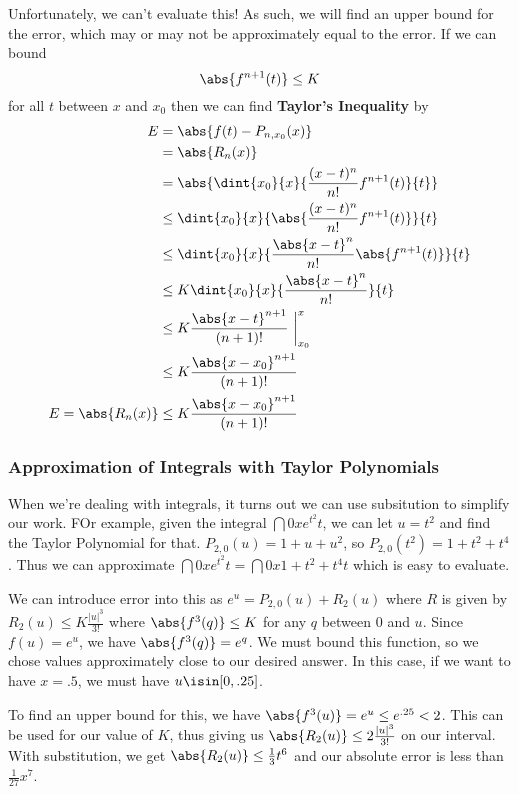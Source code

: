 \documentclass[12pt]{article}
\begin{document}
Unfortunately, we can't evaluate this! As such, we will find an upper bound for the error, which may or may not be approximately equal to the error. If we can bound \[ \abs{f^{n+1}(t)} \leq K \] for all $t$ between $x$ and $x_0$ then we can find {\bf Taylor's Inequality} by
\begin{align*}
E &= \abs{f(t) - P_{n,x_0}(x)}\\
  &= \abs{R_n(x)}\\
  &= \abs{\dint{x_0}{x}{\frac{(x-t)^n}{n!}f^{n+1}(t)}{t}}\\
  &\leq \dint{x_0}{x}{\abs{\frac{(x-t)^n}{n!}f^{n+1}(t)}}{t}\\
  &\leq \dint{x_0}{x}{\frac{\abs{x-t}^n}{n!}\abs{f^{n+1}(t)}}{t}\\
  &\leq K\dint{x_0}{x}{\frac{\abs{x-t}^n}{n!}}{t}\\
  &\leq K\frac{\abs{x-t}^{n+1}}{(n+1)!}\ \bigg|_{x_0}^x\\
  &\leq K\frac{\abs{x-x_0}^{n+1}}{(n+1)!}\\
E = \abs{R_n(x)} &\leq K\frac{\abs{x-x_0}^{n+1}}{(n+1)!}
\end{align*}

\subsubsection*{Approximation of Integrals with Taylor Polynomials}
When we're dealing with integrals, it turns out we can use subsitution to simplify our work. FOr example, given the integral $\dint{0}{x}{e^{t^2}}{t}$, we can let $u = t^2$ and find the Taylor Polynomial for that. $P_{2,0} (u) = 1 + u + u^2$, so $P_{2,0}(t^2) = 1 + t^2 + t^4$. Thus we can approximate $\dint{0}{x}{e^{t^2}}{t} = \dint{0}{x}{1 + t^2 + t^4}{t}$ which is easy to evaluate.

We can introduce error into this as $e^u = P_{2,0}(u) + R_2(u)$ where $R$ is given by $R_2(u) \leq K \frac{|u|^3}{3!}$ where $\abs{f^3(q)} \leq K$ for any $q$ between 0 and $u$.  Since $f(u) = e^u$, we have $\abs{f^3(q)} = e^q$. We must bound this function, so we chose values approximately close to our desired answer. In this case, if we want to have $x = .5$, we must have $u \isin [0, .25]$.

To find an upper bound for this, we have $\abs{f^3(u)} = e^u \leq e^{.25} < 2$. This can be used for our value of $K$, thus giving us $\abs{R_2(u)} \leq 2\frac{|u|^3}{3!}$ on our interval. With substitution, we get $\abs{R_2(u)} \leq \frac{1}{3}t^6$ and our absolute error is less than $\frac{1}{27}x^7$.
\end{document}
